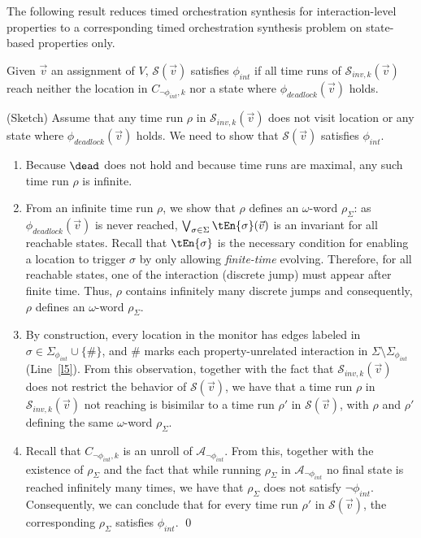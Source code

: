 The following result reduces timed orchestration synthesis for interaction-level properties to a corresponding timed orchestration synthesis problem on state-based properties only.
\begin{lemma}
\label{lem:correct}
  Given $\vec{v}$ an assignment of $V$, $\mathcal{S}(\vec{v})$ satisfies $\phi_{int}$ if all time runs of $\mathcal{S}_{inv,k}(\vec{v})$ reach neither the location  in $C_{\neg\phi_{int},k}$ nor a state where $\phi_{deadlock}(\vec{v})$ holds. 


\end{lemma}


\proof (Sketch) Assume that any time run $\rho$ in
$\mathcal{S}_{inv,k}(\vec{v})$ does not visit location  or
any state where $\phi_{deadlock}(\vec{v})$ holds. We need to show that
$\mathcal{S}(\vec{v})$ satisfies $\phi_{int}$.
\begin{enumerate}
\item 	Because $\dead$ does not hold and because time runs are maximal, any such time run $\rho$ is infinite. 
\item From an infinite time run $\rho$, we show that $\rho$ defines an
  $\omega$-word $\rho_{\Sigma}$: as $\phi_{deadlock}(\vec{v})$ is
  never reached, $\bigvee_{\sigma \in \Sigma} \tEn{\sigma}(\vec{v})$
  is an invariant for all reachable states. Recall that $\tEn{\sigma}$
  is the necessary condition for enabling a location to trigger
  $\sigma$ by only allowing \emph{finite-time} evolving. Therefore,
  for all reachable states, one of the interaction (discrete jump)
  must appear after finite time. Thus, $\rho$ contains infinitely many
  discrete jumps and consequently, $\rho$ defines an $\omega$-word
  $\rho_{\Sigma}$.
\item By construction, every location in the monitor has edges labeled
  in $\sigma \in \Sigma_{\phi_{int}} \cup \{\#\}$, and \# marks each
  property-unrelated interaction in $\Sigma\setminus
  \Sigma_{\phi_{int}}$ (Line~\ref{l5}). From this observation,
  together with the fact that $\mathcal{S}_{inv,k}(\vec{v})$ does not
  restrict the behavior of $\mathcal{S}(\vec{v})$, we have that a time
  run $\rho$ in $\mathcal{S}_{inv,k}(\vec{v})$ not reaching 
  is bisimilar to a time run $\rho'$ in $\mathcal{S}(\vec{v})$, with
  $\rho$ and $\rho'$ defining the same $\omega$-word $\rho_{\Sigma}$.
\item Recall that $C_{\neg\phi_{int},k}$ is an unroll of
  $\mathcal{A}_{\neg\phi_{int}}$. From this, together with the
  existence of $\rho_{\Sigma}$ and the fact that while running
  $\rho_{\Sigma}$ in $\mathcal{A}_{\neg\phi_{int}}$ no final state is
  reached infinitely many times, we have that $\rho_{\Sigma}$ does not
  satisfy $\neg\phi_{int}$. Consequently, we can conclude that for
  every time run $\rho'$ in $\mathcal{S}(\vec{v})$, the corresponding
  $\rho_{\Sigma}$ satisfies $\phi_{int}$. \qed
\end{enumerate}
